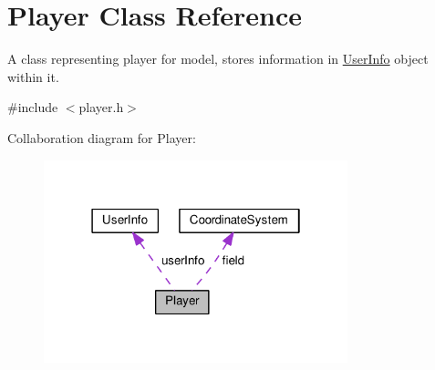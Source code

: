 \hypertarget{classMODEL_1_1Player}{}\section{Player Class Reference}
\label{classMODEL_1_1Player}


A class representing player for model, stores information in \hyperlink{classUserInfo}{User\+Info} object within it.  




{\ttfamily \#include $<$player.\+h$>$}



Collaboration diagram for Player\+:\nopagebreak
\begin{figure}[H]
\begin{center}
\leavevmode
\includegraphics[width=250pt]{classMODEL_1_1Player__coll__graph}
\end{center}
\end{figure}
